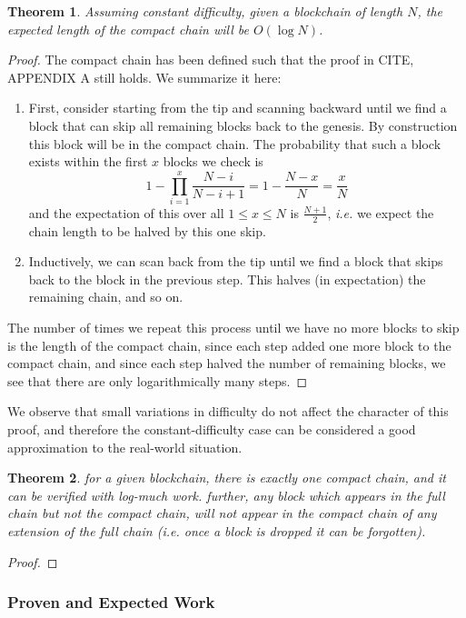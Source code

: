 \documentclass[letterpaper]{article}
\newtheorem{thrm}{Theorem}
\begin{document}
\begin{thrm} Assuming constant difficulty, given a blockchain of length
$N$, the expected length of the compact chain will be $O(\log N)$.
\end{thrm}
\begin{proof} The compact chain has been defined such that the proof in
CITE, APPENDIX A still holds. We summarize it here:
\begin{enumerate}
\item First, consider starting from the tip and scanning backward until
we find a block that can skip all remaining blocks back to the genesis.
By construction this block will be in the compact chain. The probability
that such a block exists within the first $x$ blocks we check is
\[ 1 - \prod_{i=1}^x \frac{N-i}{N-i+1} = 1 - \frac{N-x}{N} = \frac{x}N \]
and the expectation of this over all $1\leq x \leq N$ is $\frac{N+1}2$,
\emph{i.e.} we expect the chain length to be halved by this one skip.
\item Inductively, we can scan back from the tip until we find a block
that skips back to the block in the previous step. This halves (in
expectation) the remaining chain, and so on. 
\end{enumerate}
The number of times we repeat this process until we have no more blocks
to skip is the length of the compact chain, since each step added one
more block to the compact chain, and since each step halved the number
of remaining blocks, we see that there are only logarithmically many
steps.
\end{proof}
We observe that small variations in difficulty do not affect the character
of this proof, and therefore the constant-difficulty case can be considered
a good approximation to the real-world situation.

\begin{thrm} for a given blockchain, there is exactly one compact chain, and it
can be verified with log-much work. further, any block which appears in the
full chain but not the compact chain, will not appear in the compact chain
of any extension of the full chain (i.e. once a block is dropped it can be
forgotten).\label{cc_unique}\end{thrm}
\begin{proof}
\end{proof}

\subsubsection{Proven and Expected Work\label{proven_expected}}
\end{document}
